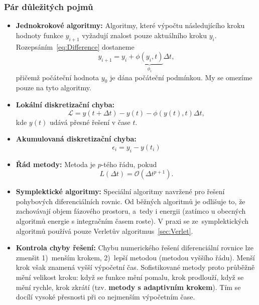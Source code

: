 \documentclass[a4paper,11pt,twoside]{article}
\begin{document}
    \subsubsection{Pár důležitých pojmů}
    \begin{itemize}
        \item {\bf Jednokrokové algoritmy:}
        Algoritmy, které výpočtu následujícího kroku hodnoty funkce $y_{i+1}$ vyžadují znalost pouze aktuálního kroku $y_{i}$.
        Rozepsáním~\eqref{eq:Difference} dostaneme
        \begin{equation}
            \boxed{
                y_{i+1}=y_{i}+\underbrace{\phi(y_{i},t)}_{\phi_{i}}\Delta t
            },
        \end{equation}
        přičemž počáteční hodnota $y_{0}$ je dána počáteční podmínkou.
        My se omezíme pouze na tyto algoritmy.

        \item {\bf Lokální diskretizační chyba:}
        \begin{equation}
            \mathcal{L}=y(t+\Delta t)-y(t)-\phi(y(t),t)\Delta t,
        \end{equation}        
        kde $y(t)$ udává přesné řešení v čase $t$.

        \item {\bf Akumulovaná diskretizační chyba:}
        \begin{equation}
            \epsilon_{i}=y_{i}-y(t_{i})
        \end{equation}

        \item {\bf Řád metody:} 
        Metoda je $p$-tého řádu, pokud
        \begin{equation}\label{eq:MethodOrder}
            L(\Delta t)=\mathcal{O}(\Delta t^{p+1}).
        \end{equation}

        \item {\bf Symplektické algoritmy:}
        Speciální algoritmy navržené pro řešení pohybových di\-fe\-ren\-ci\-ál\-ních rovnic.
        Od běžných algoritmů je odlišuje to, že zachovávají objem fázového prostoru, a~tedy i energii (zatímco u obecných algoritmů energie s integračním časem roste).
        V praxi se ze~symplektických algoritmů používá pouze Verletův algoritmus~\ref{sec:Verlet}.

        \item {\bf Kontrola chyby řešení:}
        Chybu numerického řešení diferenciální rovnice lze zmenšit 1)~men\-ším krokem, 2)~lepší metodou (metodou vyššího řádu). 
        Menší krok však znamená vyšší vý\-po\-čet\-ní čas.
        Sofistikované metody proto průběžně mění velikost kroku: když se funkce mění pomalu, krok prodlouží, když se mění rychle, krok zkrátí (tzv. {\bf metody s adaptivním krokem}).
        Tím se docílí vysoké přesnosti při co nejmenším výpočetním čase.

    \end{itemize}
\end{document}
